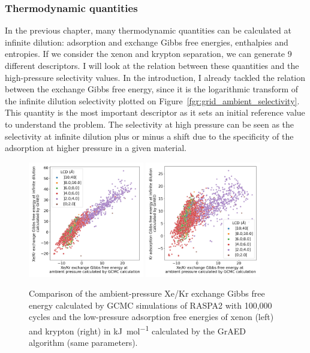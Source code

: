\documentclass[main]{subfiles}
\begin{document}
\subsubsection{Thermodynamic quantities}

In the previous chapter, many thermodynamic quantities can be calculated at infinite dilution: adsorption and exchange Gibbs free energies, enthalpies and entropies. If we consider the xenon and krypton separation, we can generate 9 different descriptors. I will look at the relation between these quantities and the high-pressure selectivity values. In the introduction, I already tackled the relation between the exchange Gibbs free energy, since it is the logarithmic transform of the infinite dilution selectivity plotted on Figure~\ref{fgr:grid_ambient_selectivity}. This quantity is the most important descriptor as it sets an initial reference value to understand the problem. The selectivity at high pressure can be seen as the selectivity at infinite dilution plus or minus a shift due to the specificity of the adsorption at higher pressure in a given material.


\begin{figure}[ht]
  \centering
    \includegraphics[width=0.45\textwidth]{figures/3-fastsim/G_2080_vs_G_Xe_grid_overview.jpg}
    \includegraphics[width=0.45\textwidth]{figures/3-fastsim/G_2080_vs_G_Kr_grid_overview.jpg}
    \caption{Comparison of the ambient-pressure Xe/Kr exchange Gibbs free energy calculated by GCMC simulations of RASPA2 with 100,000 cycles and the low-pressure adsorption free energies of xenon (left) and krypton (right) in \si{\kilo\joule\per\mole} calculated by the GrAED algorithm (same parameters).}\label{fgr:grid_comp_gibbs}
\end{figure}
\end{document}

